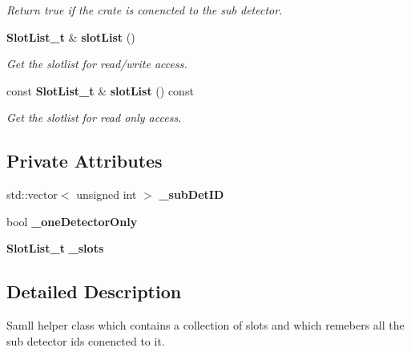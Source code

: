 \begin{DoxyCompactItemize}
\begin{DoxyCompactList}\small\item\em Return true if the crate is conencted to the sub detector. \end{DoxyCompactList}\item 
{\bf Slot\-List\-\_\-t} \& {\bf slot\-List} ()\label{classCALICE_1_1TriggerHandlerCalice_1_1Crate__t_ab71658dc613ae2c3d5f683d643838567}

\begin{DoxyCompactList}\small\item\em Get the slotlist for read/write access. \end{DoxyCompactList}\item 
const {\bf Slot\-List\-\_\-t} \& {\bf slot\-List} () const \label{classCALICE_1_1TriggerHandlerCalice_1_1Crate__t_a9bd990db0cf9d53c6946e697faabd6f7}

\begin{DoxyCompactList}\small\item\em Get the slotlist for read only access. \end{DoxyCompactList}\end{DoxyCompactItemize}
\subsection*{Private Attributes}
\begin{DoxyCompactItemize}
\item 
std\-::vector$<$ unsigned int $>$ {\bfseries \-\_\-sub\-Det\-I\-D}\label{classCALICE_1_1TriggerHandlerCalice_1_1Crate__t_a49e7c92525f987ffb4b8b83446935ce1}

\item 
bool {\bfseries \-\_\-one\-Detector\-Only}\label{classCALICE_1_1TriggerHandlerCalice_1_1Crate__t_af6fa23743ffea3d191ab389b996cd6b7}

\item 
{\bf Slot\-List\-\_\-t} {\bfseries \-\_\-slots}\label{classCALICE_1_1TriggerHandlerCalice_1_1Crate__t_af7e308e0893ec31e1d83d54e5856371b}

\end{DoxyCompactItemize}


\subsection{Detailed Description}
Samll helper class which contains a collection of slots and which remebers all the sub detector ids conencted to it. 

